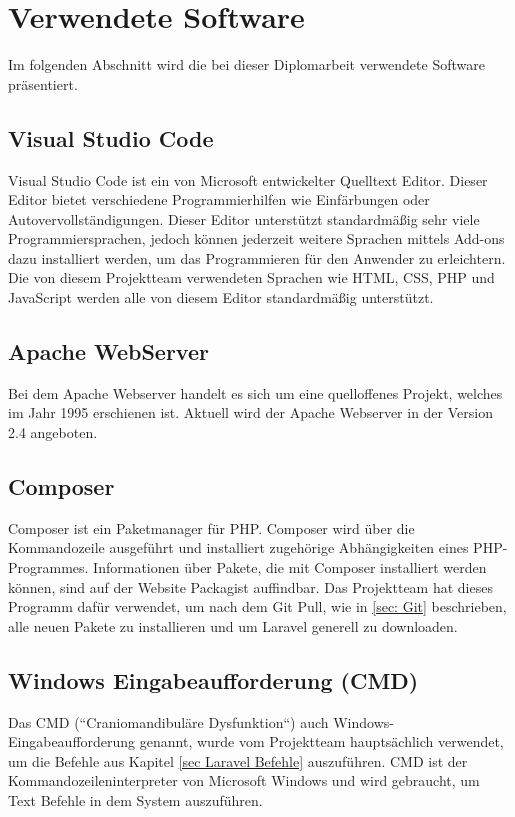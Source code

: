 \newpage
\section{Verwendete Software}
Im folgenden Abschnitt wird die bei dieser Diplomarbeit verwendete Software präsentiert.


\subsection{Visual Studio Code}
Visual Studio Code ist ein von Microsoft entwickelter Quelltext Editor. Dieser Editor bietet verschiedene Programmierhilfen wie Einfärbungen oder Autovervollständigungen. Dieser Editor unterstützt standardmäßig sehr viele Programmiersprachen, jedoch können jederzeit weitere Sprachen mittels Add-ons dazu installiert werden, um das Programmieren für den Anwender zu erleichtern. Die von diesem Projektteam verwendeten Sprachen wie HTML, CSS, PHP und JavaScript werden alle von diesem Editor standardmäßig unterstützt. 


\subsection{Apache WebServer}
Bei dem Apache Webserver handelt es sich um eine quelloffenes Projekt, welches im Jahr 1995 erschienen ist. Aktuell wird der Apache Webserver in der Version 2.4 angeboten.
\subsection{Composer}
Composer ist ein Paketmanager für PHP. Composer wird über die Kommandozeile ausgeführt und installiert zugehörige Abhängigkeiten eines PHP-Programmes. Informationen über Pakete, die mit Composer installiert werden können, sind auf der Website Packagist auffindbar. Das Projektteam hat dieses Programm dafür verwendet, um nach dem Git Pull, wie in \ref{sec: Git} beschrieben, alle neuen Pakete zu installieren und um Laravel generell zu downloaden.
\subsection{Windows Eingabeaufforderung (CMD)}
Das CMD (“Craniomandibuläre Dysfunktion“) auch Windows-Eingabeaufforderung genannt, wurde vom Projektteam hauptsächlich verwendet, um die Befehle aus Kapitel \ref{sec Laravel Befehle} auszuführen. CMD ist der Kommandozeileninterpreter von Microsoft Windows und wird gebraucht, um Text Befehle in dem System auszuführen. 
